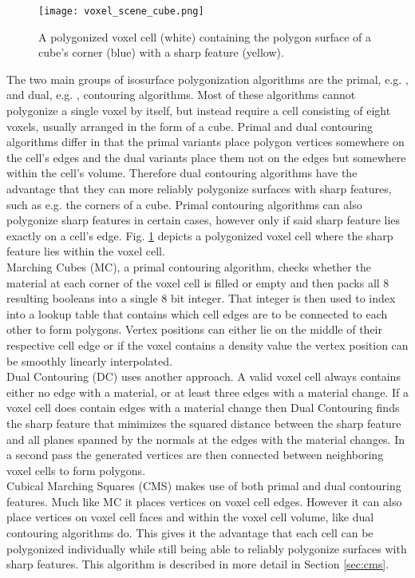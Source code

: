 \begin{figure}
\centering
\captionsetup{width=0.8\textwidth}
\texttt{[image: voxel\_scene\_cube.png]}
\caption{A polygonized voxel cell (white) containing the polygon surface of a cube's corner (blue) with a sharp feature (yellow).}
\label{fig:polygonized_cube_voxel_cell}
\end{figure}


The two main groups of isosurface polygonization algorithms are the primal, e.g. \cite{marching_cubes,transvoxel}, and dual, e.g. \cite{surface_nets,dual_contouring}, contouring algorithms.
Most of these algorithms cannot polygonize a single voxel by itself, but instead require a cell consisting of eight voxels, usually arranged in the form
of a cube. Primal and dual contouring algorithms differ in that the primal variants place polygon vertices somewhere on the cell's edges and the dual variants
place them not on the edges but somewhere within the cell's volume. Therefore dual contouring algorithms have the advantage that they can more reliably polygonize
surfaces with sharp features, such as e.g. the corners of a cube. Primal contouring algorithms can also polygonize sharp features in certain cases, however only
if said sharp feature lies exactly on a cell's edge. Fig. \ref{fig:polygonized_cube_voxel_cell} depicts a polygonized voxel cell where the sharp feature lies within
the voxel cell.\\
Marching Cubes \cite{marching_cubes} (MC), a primal contouring algorithm, checks whether the material at each corner of the voxel cell is filled or empty and then 
packs all 8 resulting booleans into a single 8 bit integer. That integer is then used to index into a lookup table that contains which cell edges are to be connected to
each other to form polygons. Vertex positions can either lie on the middle of their respective cell edge or if the voxel contains a density value the vertex position
can be smoothly linearly interpolated.\\
Dual Contouring \cite{dual_contouring} (DC) uses another approach. A valid voxel cell always contains either no edge with a material, or at least three edges with a material change. If a voxel cell
does contain edges with a material change then Dual Contouring finds the sharp feature that minimizes the squared distance between the sharp feature and all planes spanned
by the normals at the edges with the material changes. In a second pass the generated vertices are then connected between neighboring voxel cells to form polygons.\\
Cubical Marching Squares \cite{cubical_marching_squares} (CMS) makes use of both primal and dual contouring features. Much like MC it places vertices on voxel cell edges. However it can also place vertices
on voxel cell faces and within the voxel cell volume, like dual contouring algorithms do. This gives it the advantage that each cell can be polygonized individually while still being able to
reliably polygonize surfaces with sharp features. This algorithm is described in more detail in Section \ref{sec:cms}.

